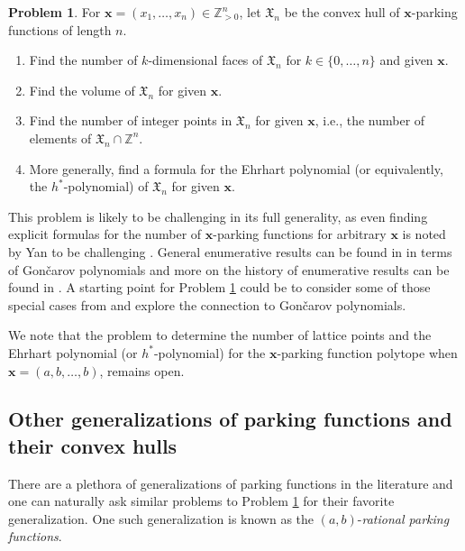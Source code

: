 \documentclass[11pt]{amsart}
\theoremstyle{definition}
\newtheorem{problem}[theorem]{Problem}
\newcommand{\0}{\emptyset}
\newcommand{\Z}{\mathbb{Z}}
\newcommand{\bx}{\mathbf{x}}
\begin{document}
\begin{problem}\label{problem_x} For $\bx=(x_1,\dots,x_n)\in \Z_{>0}^n$, let $\mathfrak{X}_n$ be the convex hull of $\bx$-parking functions of length $n$. 
\begin{enumerate}
    \item Find the number of $k$-dimensional faces of $\mathfrak{X}_n$ for $k \in \{ 0, \ldots, n\}$ and given $\bx$. 
    \item Find the volume of $\mathfrak{X}_n$ for given $\bx$. 
    \item Find the number of integer points in $\mathfrak{X}_n$ for given $\bx$, i.e., the number of elements of $\mathfrak{X}_n \cap \Z^n$.
    \item More generally, find a formula for the Ehrhart polynomial (or equivalently, the $h^*$-polynomial) of $\mathfrak{X}_n$ for given $\bx$.
\end{enumerate}    
\end{problem}
This problem is likely to be challenging in its full generality, as even finding explicit formulas for the number of $\mathbf{x}$-parking functions for arbitrary $\mathbf{x}$ is noted by Yan to be challenging \cite{Yan2}. 
General enumerative results can  be found in \cite{KY} in terms of Gon\v{c}arov polynomials and more on the history of enumerative results can be found in \cite{GH}.
A starting point for Problem \ref{problem_x} could be to consider some of those special cases from \cite{Yan2} and explore the connection to Gon\v{c}arov polynomials.

We note that the problem to determine the number of lattice points and the Ehrhart polynomial (or $h^*$-polynomial) for the $\bx$-parking function polytope when $\bx=(a,b,\dots,b)$, remains open. 

\subsection{Other generalizations of parking functions and their convex hulls}
There are a plethora of generalizations of parking functions in the literature and one can naturally ask similar problems to Problem \ref{problem_x} for their favorite generalization.  
One such generalization is known as the $(a,b)$-\emph{rational parking functions}. 
\end{document}
